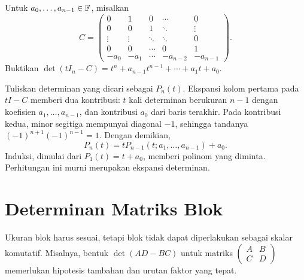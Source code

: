 \begin{exam}
      Untuk $a_0,\ldots,a_{n-1}\in\mathbb{F}$, misalkan
      \[
            C=\begin{pmatrix}
                  0      & 1      & 0      & \cdots   & 0        \\
                  0      & 0      & 1      & \ddots   & \vdots   \\
                  \vdots & \vdots & \ddots & \ddots   & 0        \\
                  0      & 0      & \cdots & 0        & 1        \\
                  -a_0   & -a_1   & \cdots & -a_{n-2} & -a_{n-1}
            \end{pmatrix}.
      \]
      Buktikan $\det(tI_n-C)=t^n+a_{n-1}t^{n-1}+\cdots+a_1t+a_0$.
\end{exam}
\begin{solution}
      Tuliskan determinan yang dicari sebagai $P_n(t)$.
      Ekspansi kolom pertama pada $tI-C$ memberi dua kontribusi:
      $t$ kali determinan berukuran $n-1$ dengan koefisien
      $a_1,\ldots,a_{n-1}$, dan kontribusi $a_0$ dari baris terakhir.
      Pada kontribusi kedua, minor segitiga mempunyai diagonal $-1$,
      sehingga tandanya $(-1)^{n+1}(-1)^{n-1}=1$.
      Dengan demikian,
      \[
            P_n(t)=tP_{n-1}(t;a_1,\ldots,a_{n-1})+a_0.
      \]
      Induksi, dimulai dari $P_1(t)=t+a_0$, memberi polinom yang diminta.
      Perhitungan ini murni merupakan ekspansi determinan.
\end{solution}

\section{Determinan Matriks Blok}
\label{det:blok}

Ukuran blok harus sesuai, tetapi blok tidak dapat diperlakukan sebagai
skalar komutatif. Misalnya, bentuk $\det(AD-BC)$ untuk matriks
$\left(\begin{smallmatrix}A&B\\C&D\end{smallmatrix}\right)$ memerlukan
hipotesis tambahan dan urutan faktor yang tepat.

